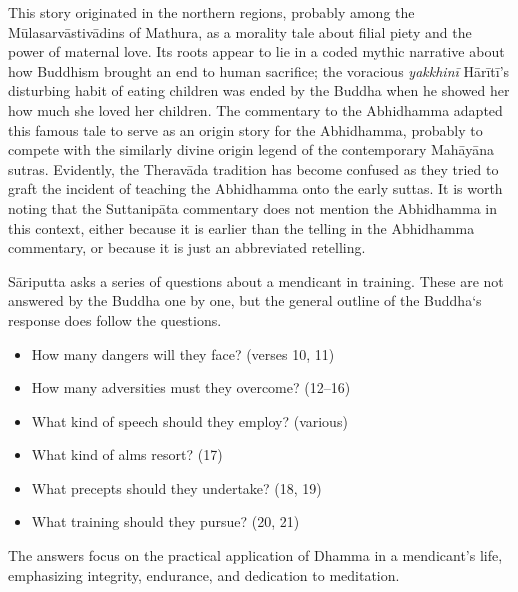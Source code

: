 \documentclass[12pt,openany]{book}%
\begin{document}
This story originated in the northern regions, probably among the \textsanskrit{Mūlasarvāstivādins} of Mathura, as a morality tale about filial piety and the power of maternal love. Its roots appear to lie in a coded mythic narrative about how Buddhism brought an end to human sacrifice; the voracious \textit{\textsanskrit{yakkhinī}} \textsanskrit{Hārītī}’s disturbing habit of eating children was ended by the Buddha when he showed her how much she loved her children. The commentary to the Abhidhamma adapted this famous tale to serve as an origin story for the Abhidhamma, probably to compete with the similarly divine origin legend of the contemporary \textsanskrit{Mahāyāna} sutras. Evidently, the \textsanskrit{Theravāda} tradition has become confused as they tried to graft the incident of teaching the Abhidhamma onto the early suttas. It is worth noting that the \textsanskrit{Suttanipāta} commentary does not mention the Abhidhamma in this context, either because it is earlier than the telling in the Abhidhamma commentary, or because it is just an abbreviated retelling.

\textsanskrit{Sāriputta} asks a series of questions about a mendicant in training. These are not answered by the Buddha one by one, but the general outline of the Buddha‘s response does follow the questions.

\begin{itemize}%
\item How many dangers will they face? (verses 10, 11)%
\item How many adversities must they overcome? (12–16)%
\item What kind of speech should they employ? (various)%
\item What kind of alms resort? (17)%
\item What precepts should they undertake? (18, 19)%
\item What training should they pursue? (20, 21)%
\end{itemize}

The answers focus on the practical application of Dhamma in a mendicant’s life, emphasizing integrity, endurance, and dedication to meditation.
\end{document}
